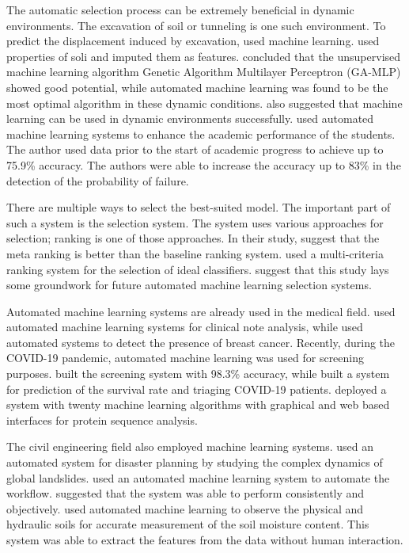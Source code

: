 \documentclass[a4paper,fleqn]{cas-dc}
\begin{document}
The automatic selection process can be extremely beneficial in dynamic environments. The excavation of soil or tunneling is one such environment. To predict the displacement induced by excavation, \cite*{ref_paper_1} used machine learning. \citeauthor{ref_paper_1} used properties of soli and imputed them as features. \citeauthor{ref_paper_1} concluded that the unsupervised machine learning algorithm Genetic Algorithm Multilayer Perceptron (GA-MLP) showed good potential, while automated machine learning was found to be the most optimal algorithm in these dynamic conditions. \cite*{ref_paper_13} also suggested that machine learning can be used in dynamic environments successfully. \cite{ref_paper_a_7} used automated machine learning systems to enhance the academic performance of the students. The author used data prior to the start of academic progress to achieve up to 75.9\% accuracy. The authors were able to increase the accuracy up to 83\% in the detection of the probability of failure.

There are multiple ways to select the best-suited model. The important part of such a system is the selection system. The system uses various approaches for selection; ranking is one of those approaches. In their study, \cite*{ref_paper_23} suggest that the meta ranking is better than the baseline ranking system. \citeauthor{ref_paper_23} used a multi-criteria ranking system for the selection of ideal classifiers. \citeauthor{ref_paper_23} suggest that this study lays some groundwork for future automated machine learning selection systems.

Automated machine learning systems are already used in the medical field. \cite{ref_paper_a_2} used automated machine learning systems for clinical note analysis, while \cite{ref_paper_a_6} used automated systems to detect the presence of breast cancer. Recently, during the COVID-19 pandemic, automated machine learning was used for screening purposes. \cite{ref_paper_a_11} built the screening system with 98.3\% accuracy, while \cite{ref_paper_a_15} built a system for prediction of the survival rate and triaging COVID-19 patients. \cite{ref_paper_a_9} deployed a system with twenty machine learning algorithms with graphical and web based interfaces for protein sequence analysis.

The civil engineering field also employed machine learning systems. \cite{ref_paper_a_10} used an automated system for disaster planning by studying the complex dynamics of global landslides. \cite{ref_paper_a_13} used an automated machine learning system to automate the workflow. \citeauthor{ref_paper_a_13} suggested that the system was able to perform consistently and objectively. \cite{ref_paper_a_8} used automated machine learning to observe the physical and hydraulic soils for accurate measurement of the soil moisture content. This system was able to extract the features from the data without human interaction.
\end{document}

